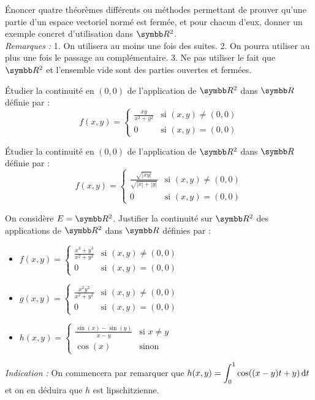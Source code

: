 \begin{exercice}
    Énoncer quatre théorèmes différents ou méthodes permettant de prouver qu'une partie d'un espace vectoriel normé est fermée,
    et pour chacun d'eux, donner un exemple concret d'utilisation dans $\R^{2}$. \\

    \textit{Remarques :}
    1. On utilisera au moins une fois des suites.
    2. On pourra utiliser au plus une fois le passage au complémentaire.
    3. Ne pas utiliser le fait que $\R^{2}$ et l'ensemble vide sont des parties ouvertes et fermées.
\end{exercice}

\begin{exercice}
    Étudier la continuité en $(0,0)$ de l'application de $\R^{2}$ dans $\R$ définie par :
    \[f(x,y) = \begin{cases} \frac{xy}{x^{2}+y^{2}} & \text{si } (x,y) \neq (0,0) \\ 0 & \text{si } (x,y) = (0,0) \end{cases}\]
\end{exercice}

\begin{exercice}
    Étudier la continuité en $(0,0)$ de l'application de $\R^{2}$ dans $\R$ définie par :
    \[f(x,y) = \begin{cases} \frac{\sqrt{|xy|}}{\sqrt{|x|+|y|}} & \text{si } (x,y) \neq (0,0) \\ 0 & \text{si } (x,y) = (0,0) \end{cases}\]
\end{exercice}

\begin{exercice}
    On considère $E=\R^{2}$. Justifier la continuité sur $\R^{2}$ des applications de $\R^{2}$ dans $\R$ définies par :
    \begin{itemize}
        \item $f(x,y) = \begin{cases} \frac{x^{3}+y^{3}}{x^{2}+y^{2}} & \text{si } (x,y) \neq (0,0) \\ 0 & \text{si } (x,y) = (0,0) \end{cases}$
        \item $g(x,y) = \begin{cases} \frac{x^{2}y^{2}}{x^{2}+y^{2}} & \text{si } (x,y) \neq (0,0) \\ 0 & \text{si } (x,y) = (0,0) \end{cases}$
        \item $h(x,y) = \begin{cases} \frac{\sin(x)-\sin(y)}{x-y} & \text{si } x \neq y \\ \cos(x) & \text{sinon} \end{cases}$
    \end{itemize}
    \textit{Indication :} On commencera par remarquer que $\displaystyle h(x,y) = \int_{0}^{1} \cos((x-y)t+y) \,\mathrm{d}t$
    et on en déduira que $h$ est lipschitzienne.
\end{exercice}

